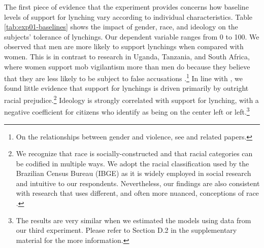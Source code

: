 \documentclass[12pt,ansiapaper]{article}
\begin{document}
The first piece of evidence that the experiment provides concerns how baseline levels of support for lynching vary according to individual characteristics. Table \ref{tab:exp01-baselines} shows the impact of gender, race, and ideology on the subjects' tolerance of lynchings. Our dependent variable ranges from 0 to 100. We observed that men are more likely to support lynchings when compared with women. This is in contrast to research in Uganda, Tanzania, and South Africa, where women support mob vigilantism more than men do because they believe that they are less likely to be subject to false accusations \citep{wilke2021gender}.\footnote{On the relationships between gender and violence, see \citet{kadera2018gendered} and related papers.} In line with \citet{martins2015linchamentos}, we found little evidence that support for lynchings is driven primarily by outright racial prejudice.\footnote{We recognize that race is socially-constructed and that racial categories can be codified in multiple ways. We adopt the racial classification used by the Brazilian Census Bureau (IBGE) as it is widely employed in social research \citep[e.g.][24]{lapop2018brazil} and intuitive to our respondents. Nevertheless, our findings are also consistent with research that uses different, and often more nuanced, conceptions of race \citep{monk2016consequences, schwartzman2020colour}. } Ideology is strongly correlated with support for lynching, with a negative coefficient for citizens who identify as being on the center left or left.\footnote{The results are very similar when we estimated the models using data from our third experiment. Please refer to Section D.2 in the supplementary material for the more information.}
\end{document}
